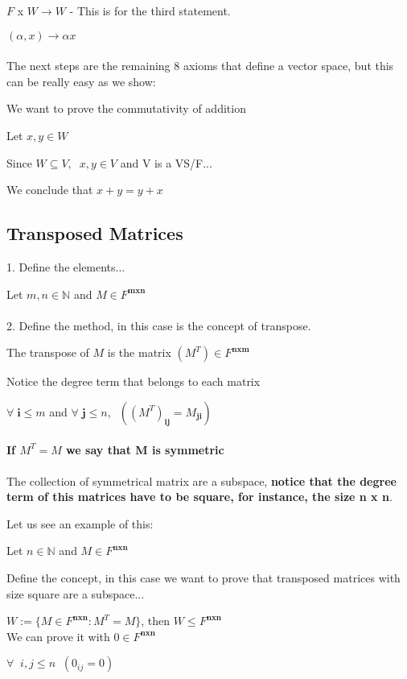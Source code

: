 \documentclass{article}
\begin{document}
\(F\) x \(W \rightarrow W\) - This is for the third statement.

\((\alpha,x) \rightarrow \alpha x\)
\\
\\
The next steps are the remaining 8 axioms that define a vector space, but this can be really easy as we show:

We want to prove the commutativity of addition

Let \(x,y \in W\) 

Since \(W \subseteq V,\;\; x,y \in V\) and V is a VS/F...

We conclude that \(x+y=y+x\)

\subsection*{Transposed Matrices}

1. Define the elements...

Let \(m,n \in \mathbb{N}\) and \(M \in F^{\textbf{mxn}} \) 
\\
\\
2. Define the method, in this case is the concept of transpose.

The transpose of \(M\) is the matrix \((M^T) \in F^{\textbf{nxm}}\) 

Notice the degree term that belongs to each matrix

\(\forall \;\textbf{i} \leq m\) and \(\forall \;\textbf{j} \leq n, \;\; ((M^T)_{\textbf{ij}} = M_{\textbf{ji}})\)
\\
\\
\textbf{If \(M^T = M\) we say that M is symmetric}
\\
\\
The collection of symmetrical matrix are a subspace, \textbf{notice that the degree term of this matrices have to be square, for instance, the size n x n}.

Let us see an example of this:

Let \(n \in \mathbb{N}\) and \(M \in F^{\textbf{nxn}} \) 

Define the concept, in this case we want to prove that transposed matrices with size square are a subspace...

\(W := \{M \in F^{\textbf{nxn}} : M^T = M\}\), then \(W \leq F^{\textbf{nxn}}\)
\\

We can prove it with \(0 \in F^{\textbf{nxn}}\)

\(\forall \;\; i,j \leq n\;\; (0_{ij} = 0) \)
\end{document}

